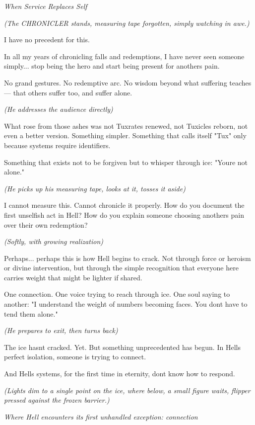 \emph{When Service Replaces Self}

\emph{(The CHRONICLER stands, measuring tape forgotten, simply watching in awe.)}


I have no precedent for this.

In all my years of chronicling falls and redemptions, I have never seen someone simply... stop being the hero and start being present for another\textquotesingle s pain.

No grand gestures. No redemptive arc. No wisdom beyond what suffering teaches--- that others suffer too, and suffer alone.

\emph{(He addresses the audience directly)}

What rose from those ashes was not Tuxrates renewed, not Tuxicles reborn, not even a better version. Something simpler. Something that calls itself "Tux" only because systems require identifiers.

Something that exists not to be forgiven but to whisper through ice: "You\textquotesingle re not alone."

\emph{(He picks up his measuring tape, looks at it, tosses it aside)}

I cannot measure this. Cannot chronicle it properly. How do you document the first unselfish act in Hell? How do you explain someone choosing another\textquotesingle s pain over their own redemption?

\emph{(Softly, with growing realization)}

Perhaps... perhaps this is how Hell begins to crack. Not through force or heroism or divine intervention, but through the simple recognition that everyone here carries weight that might be lighter if shared.

One connection. One voice trying to reach through ice. One soul saying to another: "I understand the weight of numbers becoming faces. You don\textquotesingle t have to tend them alone."

\emph{(He prepares to exit, then turns back)}

The ice hasn\textquotesingle t cracked. Yet. But something unprecedented has begun. In Hell\textquotesingle s perfect isolation, someone is trying to connect.

And Hell\textquotesingle s systems, for the first time in eternity, don\textquotesingle t know how to respond.

\emph{(Lights dim to a single point on the ice, where below, a small figure waits, flipper pressed against the frozen barrier.)}

\bookdivider

\emph{Where Hell encounters its first unhandled exception: connection}

\bookdivider
